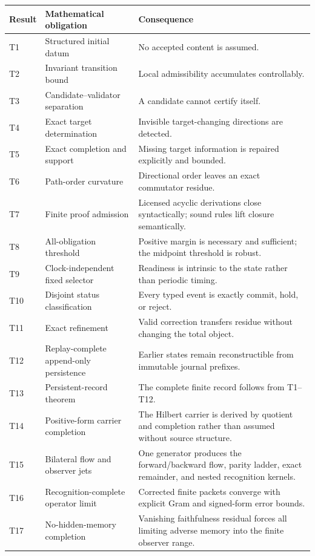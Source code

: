 \begin{longtable}{p{}p{}p{}}
\toprule
Result & Mathematical obligation & Consequence \\
\midrule
T1 & Structured initial datum & No accepted content is assumed. \\
T2 & Invariant transition bound & Local admissibility accumulates controllably. \\
T3 & Candidate--validator separation & A candidate cannot certify itself. \\
T4 & Exact target determination & Invisible target-changing directions are detected. \\
T5 & Exact completion and support & Missing target information is repaired explicitly and bounded. \\
T6 & Path-order curvature & Directional order leaves an exact commutator residue. \\
T7 & Finite proof admission & Licensed acyclic derivations close syntactically; sound rules lift closure semantically. \\
T8 & All-obligation threshold & Positive margin is necessary and sufficient; the midpoint threshold is robust. \\
T9 & Clock-independent fixed selector & Readiness is intrinsic to the state rather than periodic timing. \\
T10 & Disjoint status classification & Every typed event is exactly commit, hold, or reject. \\
T11 & Exact refinement & Valid correction transfers residue without changing the total object. \\
T12 & Replay-complete append-only persistence & Earlier states remain reconstructible from immutable journal prefixes. \\
T13 & Persistent-record theorem & The complete finite record follows from T1--T12. \\
T14 & Positive-form carrier completion & The Hilbert carrier is derived by quotient and completion rather than assumed without source structure. \\
T15 & Bilateral flow and observer jets & One generator produces the forward/backward flow, parity ladder, exact remainder, and nested recognition kernels. \\
T16 & Recognition-complete operator limit & Corrected finite packets converge with explicit Gram and signed-form error bounds. \\
T17 & No-hidden-memory completion & Vanishing faithfulness residual forces all limiting adverse memory into the finite observer range. \\

\end{longtable}
